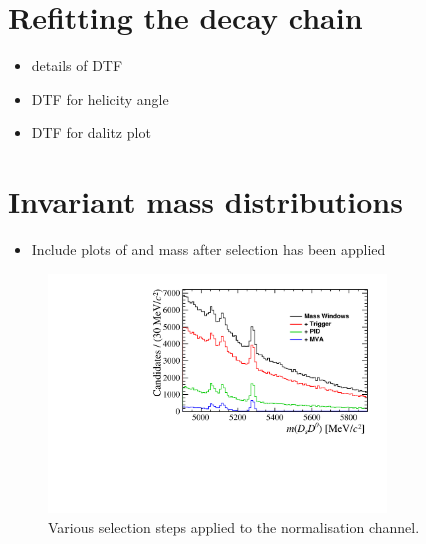 \section{Refitting the decay chain}
{\color{Red}
\begin{itemize}
\item details of DTF
\item DTF for helicity angle
\item DTF for dalitz plot
\end{itemize}
}


\section{Invariant mass distributions}

{\color{Red}
\begin{itemize}
\item Include plots of \Ds and \Kp\Km mass after selection has been applied 
\end{itemize}
}

\begin{figure}[!h]
    \centering
        \includegraphics[width=0.8\textwidth]{figs/Selection/Normalisation_with_sel_B2DsD0.pdf}
    \caption{Various selection steps applied to the normalisation channel.}
    \label{fig:norm_selection}   
\end{figure}



